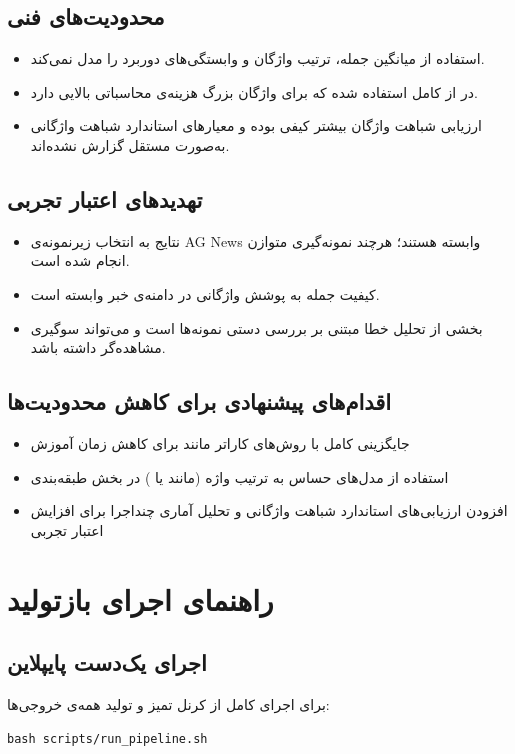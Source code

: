 \documentclass[12pt,a4paper]{article}
\begin{document}
\subsection{محدودیت‌های فنی}
\begin{itemize}
\item استفاده از میانگین  جمله، ترتیب واژگان و وابستگی‌های دوربرد را مدل نمی‌کند.
\item در  از  کامل استفاده شده که برای واژگان بزرگ هزینه‌ی محاسباتی بالایی دارد.
\item ارزیابی شباهت واژگان بیشتر کیفی بوده و معیارهای استاندارد شباهت واژگانی به‌صورت مستقل گزارش نشده‌اند.
\end{itemize}

\subsection{تهدیدهای اعتبار تجربی}
\begin{itemize}
\item نتایج به انتخاب زیرنمونه‌ی AG News وابسته هستند؛ هرچند نمونه‌گیری متوازن انجام شده است.
\item کیفیت  جمله به پوشش واژگانی  در دامنه‌ی خبر وابسته است.
\item بخشی از تحلیل خطا مبتنی بر بررسی دستی نمونه‌ها است و می‌تواند سوگیری مشاهده‌گر داشته باشد.
\end{itemize}

\subsection{اقدام‌های پیشنهادی برای کاهش محدودیت‌ها}
\begin{itemize}
\item جایگزینی  کامل با روش‌های کاراتر مانند  برای کاهش زمان آموزش
\item استفاده از مدل‌های حساس به ترتیب واژه (مانند  یا ) در بخش طبقه‌بندی
\item افزودن ارزیابی‌های استاندارد شباهت واژگانی و تحلیل آماری چنداجرا برای افزایش اعتبار تجربی
\end{itemize}

\section{راهنمای اجرای بازتولید}
\subsection{اجرای یک‌دست پایپلاین}
برای اجرای کامل از کرنل تمیز و تولید همه‌ی خروجی‌ها:
\begin{lstlisting}[caption=دستور اجرای کامل]
bash scripts/run_pipeline.sh
\end{lstlisting}
\end{document}
